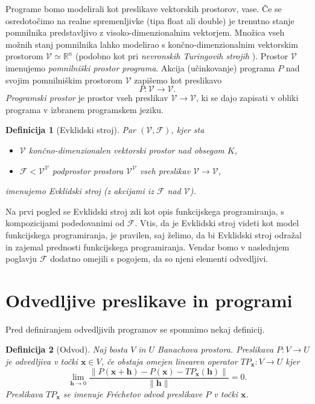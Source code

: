 \documentclass[a4paper, 12pt]{book}
\newcommand{\RR}{\mathbb{R}}
\newcommand{\VV}{\mathcal{V}}
\newcommand{\x}{\mathbf{x}}
\newcommand{\h}{\mathbf{h}}
\newcommand{\F}{\mathcal{F}}
\newtheorem{definicija}{Definicija}[chapter]
\begin{document}
Programe bomo modelirali kot preslikave vektorskih prostorov, vase. Če se osredotočimo na realne spremenljivke (tipa float ali double) je trenutno stanje pomnilnika predstavljivo z visoko-dimenzionalnim vektorjem. Množica vseh možnih stanj pomnilnika lahko modelirao s končno-dimenzionalnim vektorskim prostorom $\VV\simeq\RR^n$ (podobno kot pri \emph{nevronskih Turingovih strojih} \cite{neuTur}). Prostor $\VV$ imenujemo \emph{pomnilniški prostor programa}. Akcija (učinkovanje) programa $P$ nad svojim pomnilniškim prostorom $\VV$ zapišemo kot preslikavo
\begin{equation}
P:\VV\to\VV.
\end{equation}
\emph{Programski prostor} je prostor vseh preslikav $\VV\to\VV$, ki se dajo zapisati v obliki programa v izbranem programskem jeziku.
\begin{definicija}[Evklidski stroj]
Par $(\VV,\F)$, kjer sta
\begin{itemize}
\item
$\VV$ končno-dimenzionalen vektorski prostor nad obsegom $K$,
\item
$\F<\VV^\VV$ podprostor prostora $\VV^\VV$ vseh preslikav $\VV\to\VV$,
\end{itemize}
imenujemo \emph{Evklidski stroj} (z akcijami iz $\F$ nad $\VV$).
\end{definicija}

Na prvi pogled se Evklidski stroj zdi kot opis funkcijskega programiranja, s kompozicijami podedovanimi od $\F$. Vtis, da je Evklidski stroj videti kot model funkcijskega programiranja, je pravilen, saj želimo, da bi Evklidski stroj odražal in zajemal prednosti funkcijskega programiranja. Vendar bomo v naslednjem poglavju $\F$ dodatno omejili s pogojem, da so njeni elementi odvedljivi.

\section{Odvedljive preslikave in programi}

Pred definiranjem odvedljivih programov se spomnimo nekaj definicij.
\begin{definicija}[Odvod]
Naj bosta $V$ in $U$ Banachova prostora. Preslikava $P:V\to U$ je odvedljiva v točki
  $\x\in V$, če obstaja omejen linearen operator $TP_\x:V\to U$ kjer
  \begin{equation}
    \label{eq:frechet}
    \lim_{\h\to 0}\frac{\|P(\x+\h)-P(\x)-TP_\x(\h)\|}{\|\h\|} = 0.
  \end{equation}
  Preslikava $TP_\x$ se imenuje \emph{Fréchetov odvod} preslikave $P$ v točki $\x$.
\end{definicija}
\end{document}
